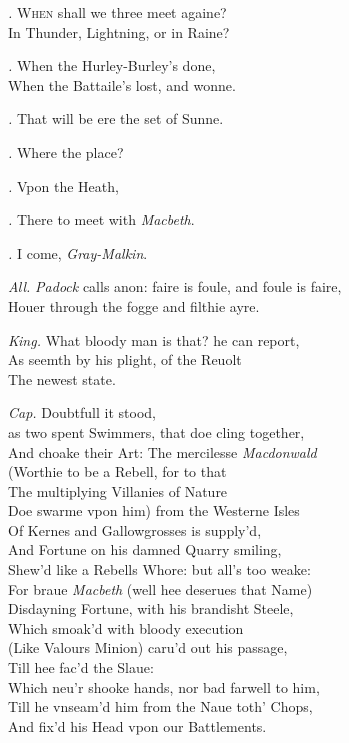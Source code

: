 \documentclass[12pt]{sides}
\newcommand{\dia}[1]{\hskip 10pt\textit{#1}\hskip 6pt}
\begin{document}
	\begin{multicols}{2}		
			
			\dia{.} \lettrine{W}{hen} shall we three meet againe? \\ In Thunder, Lightning, or in Raine?
			
			\dia{.} When the Hurley-Burley's done, \\ When the Battaile's lost, and wonne.
			
			\dia{.} That will be ere the set of Sunne.
			
			\dia{.} Where the place?
			
			\dia{.} Vpon the Heath,
			
			\dia{.} There to meet with \textit{Macbeth}.
			
			\dia{.} I come, \textit{Gray-Malkin}.
			
			\dia{All.} \textit{Padock} calls anon: faire is foule, and foule is faire, \\ Houer through the fogge and filthie ayre.
			
			\dia{King.} What bloody man is that? he can report, \\  As seemth by his plight, of the Reuolt \\ The newest state.
			
			\dia{Cap.} Doubtfull it stood,\\ as two spent Swimmers, that doe cling together,\\ And choake their Art: The mercilesse \textit{Macdonwald} \\ (Worthie to be a Rebell, for to that \\ The multiplying Villanies of Nature \\ Doe swarme vpon him) from the Westerne Isles \\ Of Kernes and Gallowgrosses is supply'd, \\ And Fortune on his damned Quarry smiling, \\ Shew'd like a Rebells Whore: but all's too weake: \\ For braue \textit{Macbeth} (well hee deserues that Name) \\ Disdayning Fortune, with his brandisht Steele, \\ Which smoak'd with bloody execution \\ (Like Valours Minion) caru'd out his passage, \\ Till hee fac'd the Slaue: \\ Which neu'r shooke hands, nor bad farwell to him, \\ Till he vnseam'd him from the Naue toth' Chops, \\ And fix'd his Head vpon our Battlements.
			

\end{multicols}
\end{document}
